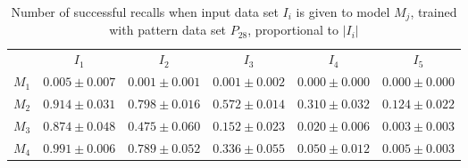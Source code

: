\documentclass[12pt]{article}
\begin{document}
\begin{appendices}
\begin{table}[H]
\begin{tabular}{cccccc}
 & $I_{1}$  & $I_{2}$  & $I_{3}$  & $I_{4}$  & $I_{5}$ \\ \cline{2-6}
$M_{1}$  & $0.005\pm0.007$  & $0.001\pm0.001$  & $0.001\pm0.002$  & $0.000\pm0.000$  & $0.000\pm0.000$ \\
$M_{2}$  & $0.914\pm0.031$  & $0.798\pm0.016$  & $0.572\pm0.014$  & $0.310\pm0.032$  & $0.124\pm0.022$ \\
$M_{3}$  & $0.874\pm0.048$  & $0.475\pm0.060$  & $0.152\pm0.023$  & $0.020\pm0.006$  & $0.003\pm0.003$ \\
$M_{4}$  & $0.991\pm0.006$  & $0.789\pm0.052$  & $0.336\pm0.055$  & $0.050\pm0.012$  & $0.005\pm0.003$ \\

    \end{tabular}
    \caption{Number of successful recalls when input data set $I_i$ is given to model $M_j$, trained with pattern data set $P_{28}$, proportional to $\left|I_i\right|$}
    \end{table}
    

    \end{appendices}
    
\end{document}

